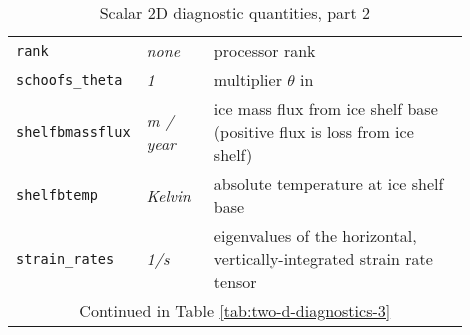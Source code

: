 \begin{table}[ht]
\begin{tabular}{p{0.15\linewidth}p{0.15\linewidth}p{0.6\linewidth}}
    \texttt{rank} & \textsl{none} &  processor rank \\
    \texttt{schoofs_theta} & \textsl{1} &  multiplier $\theta$ in \cite{Schoofbasaltopg2003} \\
    \texttt{shelfbmassflux} & \textsl{m / year} & ice mass flux from ice shelf base (positive flux is loss from ice shelf) \\
    \texttt{shelfbtemp} & \textsl{Kelvin} & absolute temperature at ice shelf base \\
    \texttt{strain_rates} & \textsl{1/s} & eigenvalues of the horizontal, vertically-integrated strain rate tensor \\
   \multicolumn{3}{c}{Continued in Table \ref{tab:two-d-diagnostics-3}}\\
  \bottomrule
  \end{tabular}
  \caption{Scalar 2D diagnostic quantities, part 2}
  \label{tab:two-d-diagnostics-2}
\end{table}

